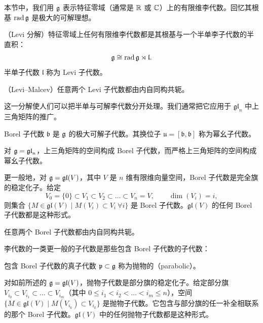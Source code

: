 本节中，我们用 $\mathfrak{g}$ 表示特征零域（通常是 $\mathbb{R}$ 或 $\mathbb{C}$）上的有限维李代数。回忆其根基 $\operatorname{rad}\mathfrak{g}$ 是极大的可解理想。

\begin{theorem}[A.29]（Levi 分解）特征零域上任何有限维李代数都是其根基与一个半单李子代数的半直积：
\[
\mathfrak{g}\cong\operatorname{rad}\mathfrak{g}\rtimes\mathfrak{l}.
\]
半单子代数 $\mathfrak{l}$ 称为 Levi 子代数。
\end{theorem}

\begin{theorem}[A.30]（Levi–Malcev）任意两个 Levi 子代数都由内自同构共轭。
\end{theorem}

这一分解使人们可以把半单与可解李代数分开处理。我们通常把它应用于 $\mathfrak{gl}_n$ 中上三角矩阵的推广。

\begin{definition}[A.31] Borel 子代数 $\mathfrak{b}$ 是 $\mathfrak{g}$ 的极大可解子代数。其换位子 $\mathfrak{u}=[\mathfrak{b},\mathfrak{b}]$ 称为幂幺子代数。
\end{definition}

\begin{example}[A.32] 对 $\mathfrak{g}=\mathfrak{gl}_n$，上三角矩阵的空间构成 Borel 子代数，而严格上三角矩阵的空间构成幂幺子代数。
\end{example}

\begin{example}[A.33] 更一般地，对 $\mathfrak{g}=\mathfrak{gl}(V)$，其中 $V$ 是 $n$ 维有限维向量空间，Borel 子代数是完全旗的稳定化子。给定
\[
V_0=\{0\}\subset V_1\subset V_2\subset\dots\subset V_n=V,\qquad \dim(V_i)=i,
\]
则集合 $\{M\in\mathfrak{gl}(V)\mid M(V_i)\subset V_i\ \forall i\}$ 是 Borel 子代数。$\mathfrak{gl}(V)$ 的任何 Borel 子代数都是这种形式。
\end{example}

\begin{proposition}[A.34] 任意两个 Borel 子代数都由内自同构共轭。
\end{proposition}

李代数的一类更一般的子代数是那些包含 Borel 子代数的子代数：

\begin{definition}[A.35] 包含 Borel 子代数的真子代数 $\mathfrak{p}\subset\mathfrak{g}$ 称为抛物的（parabolic）。
\end{definition}

\begin{example}[A.36] 对如前所述的 $\mathfrak{g}=\mathfrak{gl}(V)$，抛物子代数是部分旗的稳定化子。给定部分旗 $V_{i_0}\subset V_{i_1}\subset\dots\subset V_{i_m}$（其中 $0\le i_1<i_2<\dots<i_m\le n$），空间 $\{M\in\mathfrak{gl}(V)\mid M(V_{i_k})\subset V_{i_k}\}$ 是抛物子代数。它包含与部分旗的任一补全相联系的那个 Borel 子代数。$\mathfrak{gl}(V)$ 中的任何抛物子代数都是这种形式。
\end{example}


